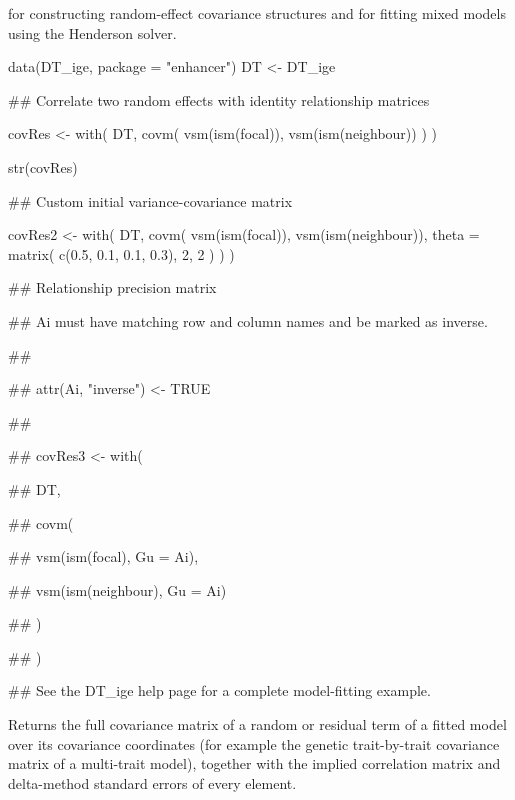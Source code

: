 \documentclass[a4paper]{book}
\begin{document}
%
\begin{SeeAlso}\relax
{} for constructing random-effect covariance structures
and  for fitting mixed models using the Henderson
solver.
\end{SeeAlso}
%
\begin{Examples}
\begin{ExampleCode}

data(DT_ige, package = "enhancer")
DT <- DT_ige

## Correlate two random effects with identity relationship matrices

covRes <- with(
DT,
covm(
vsm(ism(focal)),
vsm(ism(neighbour))
)
)

str(covRes)

## Custom initial variance-covariance matrix

covRes2 <- with(
DT,
covm(
vsm(ism(focal)),
vsm(ism(neighbour)),
theta = matrix(
c(0.5, 0.1,
0.1, 0.3),
2, 2
)
)
)

## Relationship precision matrix

## Ai must have matching row and column names and be marked as inverse.

##

## attr(Ai, "inverse") <- TRUE

##

## covRes3 <- with(

## DT,

## covm(

## vsm(ism(focal), Gu = Ai),

## vsm(ism(neighbour), Gu = Ai)

## )

## )

## See the DT_ige help page for a complete model-fitting example.

\end{ExampleCode}
\end{Examples}
%
\begin{Description}\relax
Returns the full covariance matrix of a random or residual term of a fitted
 model over its covariance coordinates (for example the
genetic trait-by-trait covariance matrix of a multi-trait model), together
with the implied correlation matrix and delta-method standard errors of every
element.
\end{Description}
\end{document}
